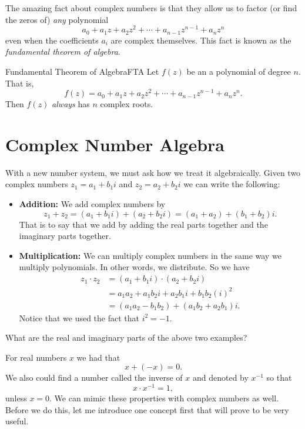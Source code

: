         The amazing fact about complex numbers is that they allow us to factor (or find the zeros of) \emph{any} polynomial
        \[
        a_0+a_1 z + a_2 z^2 + \cdots + a_{n-1}z^{n-1}+ a_n z^n
        \]
        even when the coefficients $a_i$ are complex themselves.  This fact is known as the \emph{fundamental theorem of algebra}.

        \begin{thm}{Fundamental Theorem of Algebra}{FTA}
        Let $f(z)$ be an a polynomial of degree $n$. That is,
        \[
        f(z)=a_0+a_1 z + a_2 z^2 + \cdots + a_{n-1} z^{n-1} + a_n z^n.
        \]
        Then $f(z)$ \emph{always} has $n$ complex roots.
        \end{thm}

        \section{Complex Number Algebra}

        With a new number system, we must ask how we treat it algebraically. Given two complex numbers $z_1=a_1+b_1i$ and $z_2=a_2+b_2i$ we can write the following:
        \begin{itemize}
            \item \textbf{Addition:} We add complex numbers by
            \[
            z_1+z_2=(a_1+b_1i)+(a_2+b_2i)=(a_1+a_2)+(b_1+b_2)i.
            \]
            That is to say that we add by adding the real parts together and the imaginary parts together.

            \item \textbf{Multiplication:} We can multiply complex numbers in the same way we multiply polynomials.  In other words, we distribute.  So we have
            \begin{align*}
            z_1\cdot z_2 &= (a_1+b_1i)\cdot (a_2+b_2i)\\
            &= a_1a_2+a_1b_2i+a_2b_1i+b_1b_2(i)^2\\
            &=(a_1a_2-b_1b_2)+(a_1b_2+a_2b_1)i.
            \end{align*}
            Notice that we used the fact that $i^2=-1$.
        \end{itemize}

        \begin{exercise}
        What are the real and imaginary parts of the above two examples?
        \end{exercise}

        For real numbers $x$ we had that
        \[
        x+(-x)=0.
        \]
        We also could find a number called the inverse of $x$ and denoted by $x^{-1}$ so that
        \[
        x\cdot x^{-1}=1,
        \]
        unless $x=0$. We can mimic these properties with complex numbers as well. Before we do this, let me introduce one concept first that will prove to be very useful.

